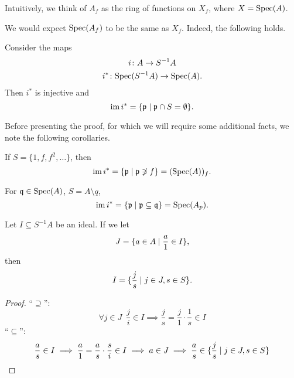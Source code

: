 Intuitively, we think of $A_f$ as the ring of functions on $X_f$, where $X = \text{Spec}(A)$.

We would expect $\text{Spec}(A_f)$ to be the same as $X_f$. Indeed, the following holds.

\begin{prop}
  \label{loc-2}
  Consider the maps
  \begin{gather*}
    i \colon A \to S^{-1}A \\
    i^* \colon \text{Spec}(S^{-1}A) \to \text{Spec}(A).
  \end{gather*}
  Then $i^*$ is injective and
  \[ \operatorname*{im} i^* = \{ \mathfrak p \mathrel{|} \mathfrak p \cap S = \emptyset \}. \]
\end{prop}

Before presenting the proof, for which we will require some additional facts, we note the following corollaries.

\begin{corollary}
  If $S = \{1, f, f^2, \ldots \}$, then
  \[ \operatorname*{im} i^* = \{ \mathfrak p \mathrel{|} \mathfrak p \not\ni f\} = (\text{Spec}(A))_f. \]
\end{corollary}

\begin{corollary}
  For $\mathfrak q \in \text{Spec}(A)$, $S = A \setminus q$,
  \[ \operatorname*{im} i^* = \{ \mathfrak p \mathrel{|} \mathfrak p \subseteq \mathfrak q \} = \text{Spec}(A_p). \]
\end{corollary}

\begin{lemma}
  \label{loc-3}
  Let $I \subseteq S^{-1}A$ be an ideal. If we let
  \[ J = \{ a \in A \mathrel{|} \frac{a}{1} \in I \}, \]
  then
  \[ I = \{ \frac{j}{s} \mathrel{|} j \in J, s \in S\}. \]
\end{lemma}
\begin{proof}
  ``$\supseteq$'':
  \[ \forall j \in J \enspace \frac{j}{i} \in I \implies \frac{j}{s} = \frac{j}{1} \cdot \frac{1}{s} \in I \]
  ``$\subseteq$'':
  \[ \frac{a}{s} \in I \implies \frac{a}{1} = \frac{a}{s} \cdot \frac{s}{i} \in I \implies a \in J \implies \frac{a}{s} \in \{\frac{j}{s} \mathrel{|} j \in J, s \in S \}\]
\end{proof}

